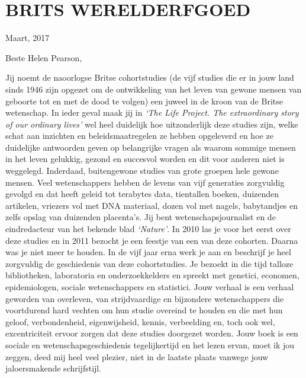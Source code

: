 \documentclass[]{book}
\begin{document}
\hypertarget{brits-werelderfgoed}{%
\chapter*{BRITS WERELDERFGOED}\label{brits-werelderfgoed}}

Maart, 2017

Beste Helen Pearson,

Jij noemt de naoorlogse Britse cohortstudies (de vijf studies die er in
jouw land sinds 1946 zijn opgezet om de ontwikkeling van het leven van
gewone mensen van geboorte tot en met de dood te volgen) een juweel in
de kroon van de Britse wetenschap. In ieder geval maak jij in \emph{`The
Life Project. The extraordinary story of our ordinary lives'} wel heel
duidelijk hoe uitzonderlijk deze studies zijn, welke schat aan inzichten
en beleidsmaatregelen ze hebben opgeleverd en hoe ze duidelijke
antwoorden geven op belangrijke vragen als waarom sommige mensen in het
leven gelukkig, gezond en succesvol worden en dit voor anderen niet is
weggelegd. Inderdaad, buitengewone studies van grote groepen hele gewone
mensen. Veel wetenschappers hebben de levens van vijf generaties
zorgvuldig gevolgd en dat heeft geleid tot terabytes data, tientallen
boeken, duizenden artikelen, vriezers vol met DNA materiaal, dozen vol
met nagels, babytandjes en zelfs opslag van duizenden placenta's. Jij
bent wetenschapsjournalist en de eindredacteur van het bekende blad
\emph{`Nature'}. In 2010 las je voor het eerst over deze studies en in
2011 bezocht je een feestje van een van deze cohorten. Daarna was je
niet meer te houden. In de vijf jaar erna werk je aan en beschrijf je
heel zorgvuldig de geschiedenis van deze cohortstudies. Je bezoekt in
die tijd talloze bibliotheken, laboratoria en onderzoekkelders en
spreekt met genetici, economen, epidemiologen, sociale wetenschappers en
statistici. Jouw verhaal is een verhaal geworden van overleven, van
strijdvaardige en bijzondere wetenschappers die voortdurend hard vechten
om hun studie overeind te houden en die met hun geloof, verbondenheid,
eigenwijsheid, kennis, verbeelding en, toch ook wel, excentriciteit
ervoor zorgen dat deze studies doorgezet worden. Jouw boek is een
sociale en wetenschapsgeschiedenis tegelijkertijd en het lezen ervan,
moet ik jou zeggen, deed mij heel veel plezier, niet in de laatste
plaats vanwege jouw jaloersmakende schrijfstijl.
\end{document}
